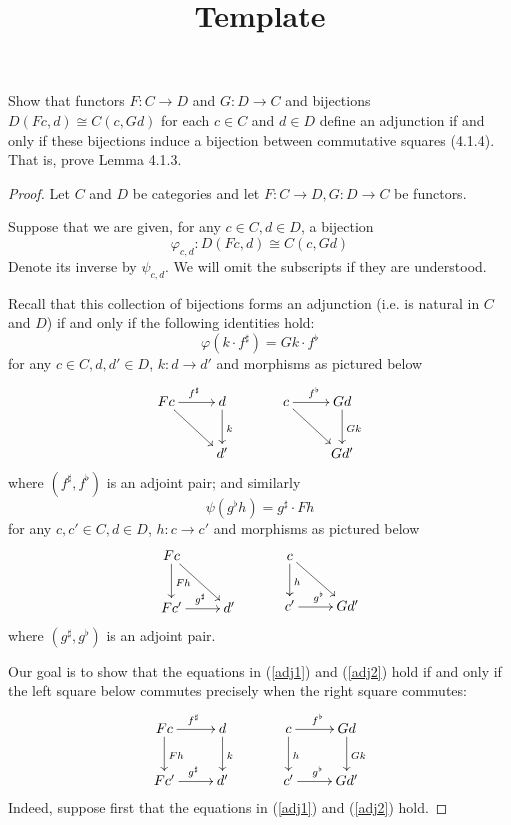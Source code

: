 \documentclass[../../solutions]{subfiles}
\title{Template}
\author{}
\begin{document}
\maketitle

%   

\begin{exercise}
Show that functors $F : C \to D$ and $G : D \to C$ and bijections $D(Fc, d) \cong C(c, Gd)$ for each $c \in C$ and $d \in D$ define an adjunction if and only if these bijections induce a bijection between commutative squares (4.1.4). That is, prove Lemma 4.1.3.
\end{exercise}

\begin{proof}

Let $C$ and $D$ be categories and let $F : C \to D , G : D \to C$ be functors.

Suppose that we are given, for any $c\in C, d \in D$, a bijection \[ \varphi_{c,d}: D(Fc, d) \cong C(c, Gd) \]
Denote its inverse by $\psi_{c,d}$. We will omit the subscripts if they are understood.

Recall that this collection of bijections forms an adjunction (i.e. is natural in $C$ and $D$) if and only if the following identities hold:
\begin{equation} \label{adj1}
\varphi(k\cdot f^\sharp) = Gk \cdot f^\flat
\end{equation}
for any $c \in C, d, d' \in D$, $k : d\to d'$ and morphisms as pictured below
\[
\xymatrix{
 Fc\ar[dr] \ar[r]^{f^\sharp} & d \ar[d]^{k}\\
  & d'
} \ \ \ \ \ \ \ \ \ 
\xymatrix{
 c\ar[dr] \ar[r]^{f^\flat} & Gd \ar[d]^{Gk}\\
 & Gd'
} 
\]
where $(f^\sharp, f^\flat)$ is an adjoint pair; and similarly
\begin{equation} \label{adj2}
\psi(g^\flat  h) = g^\sharp \cdot Fh
\end{equation}
for any $c,c'\in C, d \in D$, $h : c \to c'$ and morphisms as pictured below
\[
\xymatrix{
 Fc\ar[d]^{Fh} \ar[dr] & \\
 Fc'\ar[r]^{g^\sharp} & d'
} \ \ \ \ \ \ \ \ \ 
\xymatrix{
 c\ar[d]^{h} \ar[dr] & \\
 c'\ar[r]^{g^\flat} & Gd'
} 
\]
where $(g^\sharp, g^\flat)$ is an adjoint pair.

Our goal is to show that the equations in (\ref{adj1}) and (\ref{adj2}) hold if and only if the left square below commutes precisely when the right square commutes:
\[
\xymatrix{
 Fc\ar[d]^{Fh} \ar[r]^{f^\sharp} & d \ar[d]^{k}\\
 Fc'\ar[r]^{g^\sharp} & d'
} \ \ \ \ \ \ \ \ \ 
\xymatrix{
 c\ar[d]^{h} \ar[r]^{f^\flat} & Gd \ar[d]^{Gk}\\
 c'\ar[r]^{g^\flat} & Gd'
} 
\]
Indeed, suppose first that the equations in (\ref{adj1}) and (\ref{adj2}) hold.


\end{proof}
\end{document}
